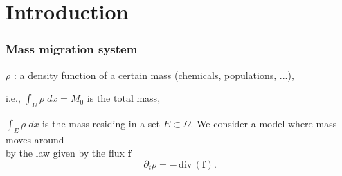 \documentclass{beamer}
\def\blue{\color{blue}}
\def\green{\color{green}}
\def\div{\,\textrm{div}\,}
\begin{document}
% 

\section{Introduction}
\begin{frame}
 \frametitle{Mass migration system}
 

 $\rho$ : a {\green density} function of a certain mass (chemicals, populations, ...), \pause
 
 i.e., $\displaystyle \int_\Omega \rho \; dx = M_0$ is the {\blue total mass},
 
 $\displaystyle \int_E \rho \; dx $ is the {\blue mass residing in a set $E\subset \Omega$}. \pause
 \vfill
 We consider a model where mass moves around\\
 by the law given by the {\blue flux $\mathbf{f}$}
 $$ \partial_t \rho = -\div( \mathbf{f} ).$$%
\end{frame}
\end{document}

